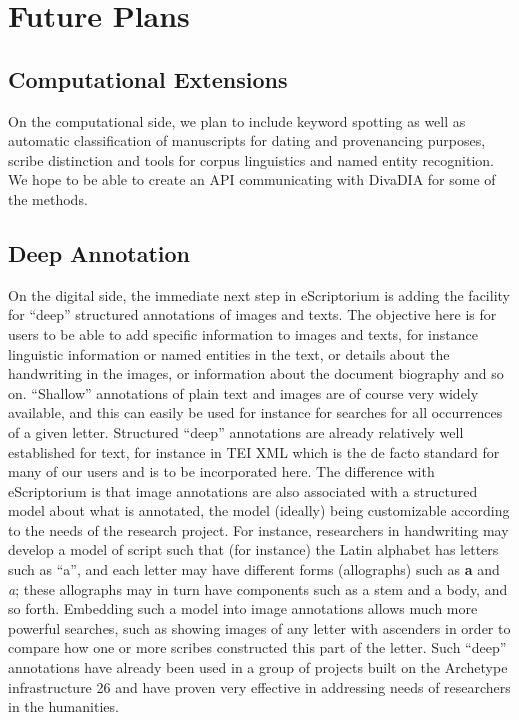 \section{Future Plans}

\subsection{Computational Extensions}

On the computational side, we plan to include keyword spotting as well as
automatic classification of manuscripts for dating and provenancing purposes,
scribe distinction and tools for corpus linguistics and named entity
recognition. We hope to be able to create an API communicating with DivaDIA for
some of the methods\cite{wursch2017divaservices}.

\subsection{Deep Annotation}

On the digital side, the immediate next step in eScriptorium is adding the
facility for “deep” structured annotations of images and texts. The objective
here is for users to be able to add specific information to images and texts,
for instance linguistic information or named entities in the text, or details
about the handwriting in the images, or information about the document
biography and so on. “Shallow” annotations of plain text and images are of
course very widely available, and this can easily be used for instance for
searches for all occurrences of a given letter. Structured “deep” annotations
are already relatively well established for text, for instance in TEI XML which
is the de facto standard for many of our users and is to be incorporated here.
The difference with eScriptorium is that image annotations are also associated
with a structured model about what is annotated, the model (ideally) being
customizable according to the needs of the research project. For instance,
researchers in handwriting may develop a model of script such that (for
instance) the Latin alphabet has letters such as “a”, and each letter may have
different forms (allographs) such as \textbf{a} and \textit{a}; these
allographs may in turn have components such as a stem and a body, and so
forth\cite{stokes2018modelling}.  Embedding such a model into image annotations
allows much more powerful searches, such as showing images of any letter with
ascenders in order to compare how one or more scribes constructed this part of
the letter. Such “deep” annotations have already been used in a group of
projects built on the Archetype infrastructure 26 and have proven very
effective in addressing needs of researchers in the humanities.

